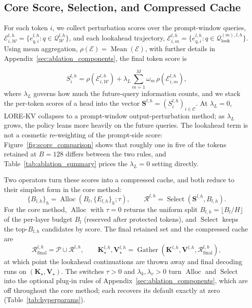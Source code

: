 \documentclass{article} %
\begin{document}
\subsection{Core Score, Selection, and Compressed Cache}
\label{subsec:core_score}

For each token $i$, we collect perturbation scores over the prompt-window queries, $\mathcal{E}^{l,h}_{i,\mathcal{W}} =\{e^{l,h}_{q,i}:q\in\mathcal{Q}^{l,h}_{\mathcal{W}}\}$, and each lookahead trajectory, $\mathcal{E}^{l,h}_{i,m} =\{e^{l,h}_{q,i}:q\in\mathcal{Q}^{(m),l,h}_{\mathrm{look}}\}$. Using mean aggregation, $\rho(\mathcal{E})=\operatorname{Mean}(\mathcal{E})$, with further details in Appendix~\ref{sec:ablation_components}, the final token score is

\begin{equation}
S^{l,h}_{i}
=\rho(\mathcal{E}^{l,h}_{i,\mathcal{W}})
+\lambda_L\sum_{m=1}^{M}\omega_m\,\rho(\mathcal{E}^{l,h}_{i,m}),
\label{eq:final_score}
\end{equation}
where $\lambda_L$ governs how much the future-query information counts, and we stack the per-token scores of a head into the vector $\mathbf{S}^{l,h}=(S^{l,h}_i)_{i\in\mathcal{C}}$. At $\lambda_L=0$, LORE-KV collapses to a prompt-window output-perturbation method; as $\lambda_L$ grows, the policy leans more heavily on the future queries. The lookahead term is not a cosmetic re-weighting of the prompt-side score: Figure~\ref{fig:score_comparison} shows that roughly one in five of the tokens retained at $B=128$ differs between the two rules, and Table~\ref{tab:ablation_summary} prices the $\lambda_L{=}0$ setting directly.

Two operators turn these scores into a compressed cache, and both reduce to their simplest form in the core method:
\begin{equation}
\{B_{l,h}\}_{h}=\operatorname{Alloc}\!\left(B_l,\{E_{l,h}\}_{h};\tau\right),
\qquad
\mathcal{R}^{l,h}=\operatorname{Select}\!\left(\mathbf{S}^{l,h},B_{l,h}\right).
\label{eq:alloc_select}
\end{equation}
For the core method, $\operatorname{Alloc}$ with $\tau=0$ returns the uniform split $B_{l,h}=\lfloor B_l/H\rfloor$ of the per-layer budget $B_l$ (reserved after protected tokens), and $\operatorname{Select}$ keeps the top-$B_{l,h}$ candidates by score. The final retained set and the compressed cache are
\begin{equation}
\mathcal{R}^{l,h}_{\mathrm{final}}=\mathcal{P}\cup\mathcal{R}^{l,h},
\qquad
\mathbf{K}^{l,h}_{\star},\mathbf{V}^{l,h}_{\star}
=\operatorname{Gather}\left(\mathbf{K}^{l,h},\mathbf{V}^{l,h},\mathcal{R}^{l,h}_{\mathrm{final}}\right),
\label{eq:gather}
\end{equation}
at which point the lookahead continuations are thrown away and final decoding runs on $(\mathbf{K}_\star,\mathbf{V}_\star)$. The switches $\tau>0$ and $\lambda_k,\lambda_v>0$ turn $\operatorname{Alloc}$ and $\operatorname{Select}$ into the optional plug-in rules of Appendix~\ref{sec:ablation_components}, which are off throughout the core method; each recovers its default exactly at zero (Table~\ref{tab:hyperparams}).
\end{document}

